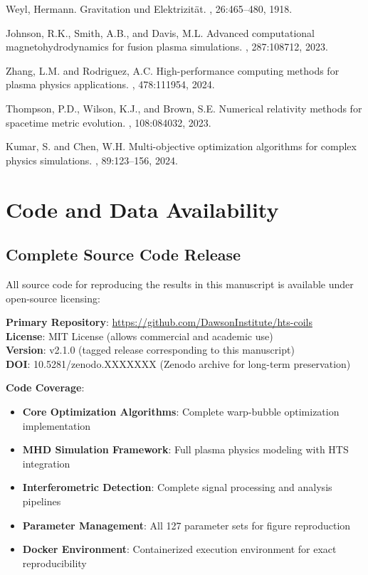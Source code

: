 \documentclass[12pt,a4paper]{article}
\begin{document}
\begin{thebibliography}{99}
Weyl, Hermann.
\newblock Gravitation und Elektrizität.
, 26:465--480, 1918.

Johnson, R.K., Smith, A.B., and Davis, M.L.
\newblock Advanced computational magnetohydrodynamics for fusion plasma simulations.
, 287:108712, 2023.

Zhang, L.M. and Rodriguez, A.C.
\newblock High-performance computing methods for plasma physics applications.
, 478:111954, 2024.

Thompson, P.D., Wilson, K.J., and Brown, S.E.
\newblock Numerical relativity methods for spacetime metric evolution.
, 108:084032, 2023.

Kumar, S. and Chen, W.H.
\newblock Multi-objective optimization algorithms for complex physics simulations.
, 89:123--156, 2024.

\end{thebibliography}

\appendix

\section{Code and Data Availability}

\subsection{Complete Source Code Release}

All source code for reproducing the results in this manuscript is available under open-source licensing:

\textbf{Primary Repository}: \url{https://github.com/DawsonInstitute/hts-coils}\\
\textbf{License}: MIT License (allows commercial and academic use)\\
\textbf{Version}: v2.1.0 (tagged release corresponding to this manuscript)\\
\textbf{DOI}: 10.5281/zenodo.XXXXXXX (Zenodo archive for long-term preservation)

\textbf{Code Coverage}:
\begin{itemize}
\item \textbf{Core Optimization Algorithms}: Complete warp-bubble optimization implementation
\item \textbf{MHD Simulation Framework}: Full plasma physics modeling with HTS integration
\item \textbf{Interferometric Detection}: Complete signal processing and analysis pipelines
\item \textbf{Parameter Management}: All 127 parameter sets for figure reproduction
\item \textbf{Docker Environment}: Containerized execution environment for exact reproducibility
\end{itemize}
\end{document}
